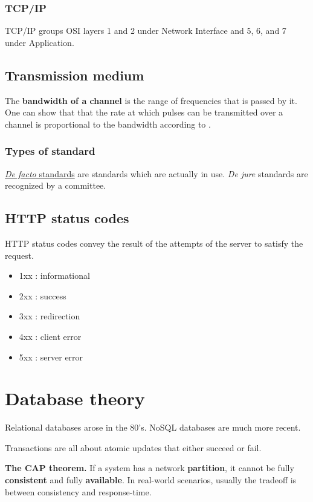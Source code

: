 \documentclass[12pt, oneside]{book}
\begin{document}
\subsection{TCP/IP}

TCP/IP groups OSI layers 1 and 2 under Network Interface and 5, 6, and 7 under Application.

\section{Transmission medium}

The \textbf{bandwidth of a channel} is the range of frequencies that is passed by it.
One can show that that the rate at which pulses can be transmitted over a channel is proportional to the bandwidth according to \cite{communication-networks-leon-garcia-2000}.

\subsection{Types of standard}

\href{https://en.wikipedia.org/wiki/De_facto_standard}{\emph{De facto}
standards} are standards which are actually in use. \emph{De jure}
standards are recognized by a committee.

\section{HTTP status codes}
HTTP status codes convey the result of the attempts of the server to satisfy the request.

\begin{itemize}
 \item 1xx : informational
 \item 2xx : success
 \item 3xx : redirection
 \item 4xx : client error
 \item 5xx : server error
\end{itemize}

\chapter{Database theory}

Relational databases arose in the 80's. NoSQL databases are much more recent.

Transactions are all about atomic updates that either succeed or fail.

\textbf{The CAP theorem.} If a system has a network \textbf{partition}, it
cannot be fully \textbf{consistent} and fully \textbf{available}. In real-world
scenarios, usually the tradeoff is between consistency and response-time.
\end{document}
